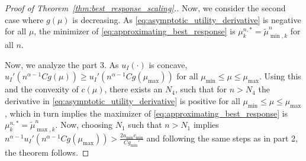 \documentclass[a4paper,11pt,twoside]{article}
\numberwithin{equation}{section}
\numberwithin{figure}{section}
\theoremstyle{plain}
\newcommand{\1}{\mathbbm{1}}
\begin{document}
\begin{proof}[Proof of Theorem~\ref{thm:best_response_scaling}.]
Now, we consider the second case where $g(\mu)$ is decreasing. As \eqref{eq:asymptotic_utility_derivative} is negative for all $\mu$, the minimizer of \eqref{eq:approximating_best_response} is $\mu_{k}^{n,*}=\tilde{\mu}_{\min,k}^n$ for all $n$. 

Now, we analyze the part 3. As $u_I(\cdot)$ is concave, $u_I'(n^{\alpha-1}Cg(\mu))\geq u_I'(n^{\alpha-1}Cg(\mu_{\max}))$ for all $\mu_{\min}\leq \mu\leq \mu_{\max}$. Using this and the convexity of $c(\mu)$, there exists an $N_4$, such that for $n>N_4$ the derivative in \eqref{eq:asymptotic_utility_derivative} is positive for all $\mu_{\min}\leq \mu \leq \mu_{\max}$, which in turn implies the maximizer of \eqref{eq:approximating_best_response} is $\mu_{k}^{n,*}=\tilde{\mu}_{\max, k}^n$. Now, choosing $N_1$ such that $n>N_1$ implies $n^{\alpha-1}u_I'(n^{\alpha-1}Cg(\mu_{\max}))>\frac{2a_{\min}c_{\min}}{Cg_{\min}'}$ and following the same steps as in part 2, the theorem follows.
\end{proof}
\endproof
\end{document}
